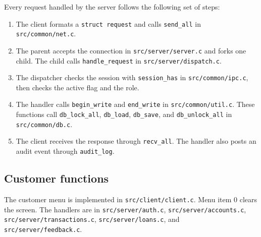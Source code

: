 \documentclass[11pt,a4paper]{article}
\begin{document}
Every request handled by the server follows the following set of steps:
\begin{enumerate}
\item The client formats a \texttt{struct request} and calls \texttt{send\_all} in \texttt{src/common/net.c}.
\item The parent accepts the connection in \texttt{src/server/server.c} and forks one child. The child calls \texttt{handle\_request} in \texttt{src/server/dispatch.c}.
\item The dispatcher checks the session with \texttt{session\_has} in \texttt{src/common/ipc.c}, then checks the active flag and the role.
\item The handler calls \texttt{begin\_write} and \texttt{end\_write} in \texttt{src/common/util.c}. These functions call \texttt{db\_lock\_all}, \texttt{db\_load}, \texttt{db\_save}, and \texttt{db\_unlock\_all} in \texttt{src/common/db.c}.
\item The client receives the response through \texttt{recv\_all}. The handler also posts an audit event through \texttt{audit\_log}.
\end{enumerate}

\subsection{Customer functions}

The customer menu is implemented in \texttt{src/client/client.c}. Menu item 0 clears the screen. The handlers are in \texttt{src/server/auth.c}, \texttt{src/server/accounts.c}, \texttt{src/server/transactions.c}, \texttt{src/server/loans.c}, and \texttt{src/server/feedback.c}.
\end{document}
